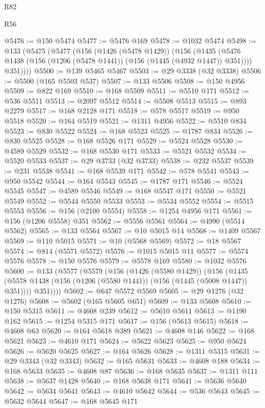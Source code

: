 \begin{lexlean}{R82}
\begin{lexlean}{R56}
\begin{coremodule}
{{{{{{{{{{{{{{{{{{{{{{{{{{{{{{{{{{{{{{{{{{{{{{{{{{{{{{{{{{{{{{{{{{{{{{{{{{{{{{{{{{{{{{{{{{{{{{{{{{{{{{{{{{{{{{{{{{{{{{{{{{{{{{{{{{{{{{{{{{{{{{{{{{{{{{{{{{{{{{{{{{{{{{{{{{{{{{{{{{{{{{{{{{{{{{{{{{{{{{{{{{{{{{{{{{{@5476 := @150 @5474
@5477 := @5476 @169
@5478 := @1032 @5474
@5498 := @133
    (@5475
      (@5477
        (@156
          (@1426 (@5478 @1429))
          (@156
            (@1435 (@5476 @1438 (@156 (@1206 (@5478 @1441)) (@156 (@1445 (@4932 @1447)) @351))))
            @351))))
@5500 := @139 @5465 @5467
@5503 := @29 @3338 (@32 @3338)
@5506 := @5500 (@165 @5503 @537)
@5507 := @133 @5506
@5508 := @150 @4956
@5509 := @822 @169
@5510 := @168 @5509
@5511 := @5510 @171
@5512 := @536 @5511
@5513 := @2097 @5512
@5514 := @5508 @5513
@5515 := @893 @2279
@5517 := @168 @2128 @171
@5518 := @578 @5517
@5519 := @950 @5518
@5520 := @164 @5519
@5521 := @1311 @4956
@5522 := @5510 @834
@5523 := @830 @5522
@5524 := @168 @5523
@5525 := @1787 @834
@5526 := @830 @5525
@5528 := @168 @5526 @171
@5529 := @5524 @5528
@5530 := @4589 @5529
@5532 := @168 @5530 @171
@5533 := @5521 @5532
@5534 := @5520 @5533
@5537 := @29 @3733 (@32 @3733)
@5538 := @232 @5537
@5539 := @231 @5538
@5541 := @168 @5539 @171
@5542 := @578 @5541
@5543 := @950 @5542
@5544 := @164 @5543
@5545 := @1787 @171
@5546 := @5524 @5545
@5547 := @4589 @5546
@5549 := @168 @5547 @171
@5550 := @5521 @5549
@5552 := @5544 @5550 @5533
@5553 := @5534 @5552
@5554 := @5515 @5553
@5556 := @156 (@2100 @5554)
@5558 := @1254 @4956 @171
@5561 := @156 (@1206 @5558) @351
@5562 := @5556 @5561
@5564 := @4990 (@5514 @5562)
@5565 := @133 @5564
@5567 := @10 @5015 @14
@5568 := @1409 @5567
@5569 := @110 @5015
@5571 := @10 (@5568 @5569)
@5572 := @18 @5567
@5574 := @814 (@5571 @5572)
@5576 := @1015 @5015 @11
@5577 := @5574 @5576
@5578 := @150 @5576
@5579 := @5578 @169
@5580 := @1032 @5576
@5600 := @133
    (@5577
      (@5579
        (@156
          (@1426 (@5580 @1429))
          (@156
            (@1435 (@5578 @1438 (@156 (@1206 (@5580 @1441)) (@156 (@1445 (@5008 @1447)) @351))))
            @351))))
@5602 := @647 @5572 @5569
@5605 := @29 @1276 (@32 @1276)
@5608 := @5602 (@165 @5605 @651)
@5609 := @133 @5608
@5610 := @150 @5315
@5611 := @4608 @239
@5612 := @5610 @5611
@5613 := @1190 @162
@5615 := @1254 @5315 @171
@5617 := @156 (@5613 @5615)
@5618 := @4608 @63
@5620 := @164 @5618 @389
@5621 := @4608 @146
@5622 := @168 @5621
@5623 := @4610 @171
@5624 := @5622 @5623
@5625 := @950 @5624
@5626 := @5620 @5625
@5627 := @164 @5626
@5628 := @1311 @5315
@5631 := @29 @3343 (@32 @3343)
@5632 := @165 @5631
@5633 := @4608 @188
@5634 := @168 @5633
@5635 := @4608 @87
@5636 := @168 @5635
@5637 := @1311 @111
@5638 := @5637 @1428
@5640 := @168 @5638 @171
@5641 := @5636 @5640
@5642 := @5634 @5641
@5643 := @4610 @5642
@5644 := @536 @5643
@5645 := @5632 @5644
@5647 := @168 @5645 @171
}}}}}}}}}}}}}}}}}}}}}}}}}}}}}}}}}}}}}}}}}}}}}}}}}}}}}}}}}}}}}}}}}}}}}}}}}}}}}}}}}}}}}}}}}}}}}}}}}}}}}}}}}}}}}}}}}}}}}}}}}}}}}}}}}}}}}}}}}}}}}}}}}}}}}}}}}}}}}}}}}}}}}}}}}}}}}}}}}}}}}}}}}}}}}}}}}}}}}}}}}}}}}}}}}}}
\end{coremodule}
\end{lexlean}
\end{lexlean}
